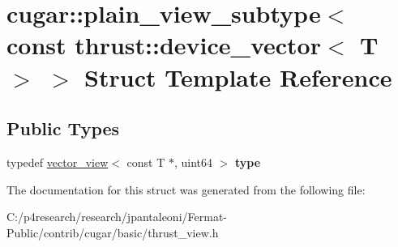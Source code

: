 \hypertarget{structcugar_1_1plain__view__subtype_3_01const_01thrust_1_1device__vector_3_01_t_01_4_01_4}{}\section{cugar\+:\+:plain\+\_\+view\+\_\+subtype$<$ const thrust\+:\+:device\+\_\+vector$<$ T $>$ $>$ Struct Template Reference}
\label{structcugar_1_1plain__view__subtype_3_01const_01thrust_1_1device__vector_3_01_t_01_4_01_4}
\subsection*{Public Types}
\begin{DoxyCompactItemize}
\item 
\mbox{\label{structcugar_1_1plain__view__subtype_3_01const_01thrust_1_1device__vector_3_01_t_01_4_01_4_ab16b5351386e757c3eb8dfbe58f746a5}} 
typedef \hyperlink{structcugar_1_1vector__view}{vector\+\_\+view}$<$ const T $\ast$, uint64 $>$ {\bfseries type}
\end{DoxyCompactItemize}


The documentation for this struct was generated from the following file\+:\begin{DoxyCompactItemize}
\item 
C\+:/p4research/research/jpantaleoni/\+Fermat-\/\+Public/contrib/cugar/basic/thrust\+\_\+view.\+h\end{DoxyCompactItemize}
